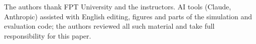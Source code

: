 \documentclass[manuscript,screen]{acmart}
\begin{document}
\begin{acks}
The authors thank FPT University and the instructors. AI tools (Claude, Anthropic) assisted with English editing,
figures and parts of the simulation and evaluation code; the authors reviewed all such material and take full
responsibility for this paper.
\end{acks}



\end{document}
